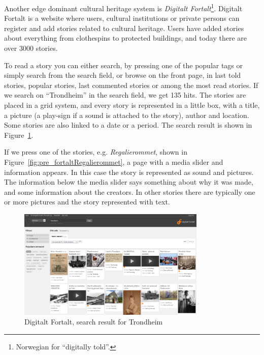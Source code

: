 \documentclass[11pt]{book}
\begin{document}
Another edge dominant cultural heritage system is \emph{Digitalt Fortalt}\footnote{Norwegian for ``digitally told''.}. Digitalt Fortalt is a website where users, cultural institutions or private persons can register and add stories related to cultural heritage. Users have added stories about everything from clothespins to protected buildings, and today there are over 3000 stories. 

To read a story you can either search, by pressing one of the popular tags or simply search from the search field, or browse on the front page, in last told stories, popular stories, last commented stories or among the most  read stories. If we search on ``Trondheim'' in the search field, we get 135 hits. The stories are placed in a grid system, and every story is represented in a little box, with a title, a picture (a play-sign if a sound is attached to the story), author and location. Some stories are also linked to a date or a period. The search result is shown in Figure~\ref{fig:pre_fortaltTrondheim}.

If we press one of the stories, e.g. \emph{Regalierommet}, shown in Figure~\ref{fig:pre_fortaltRegalierommet}, a page with a media slider and information appears. In this case the story is represented as sound and pictures. The information below the media slider says something about why it was made, and some information about the creators. In other stories there are typically one or more pictures and the story represented with text.

\begin{figure}[H]
      \centering
      \includegraphics[width=0.8\textwidth]{Figures/Prestudy/digitaltfortaltSokTrondheim.png}
      \caption{ Digitalt Fortalt, search result for Trondheim}
      \label{fig:pre_fortaltTrondheim}
\end{figure}
\end{document}
